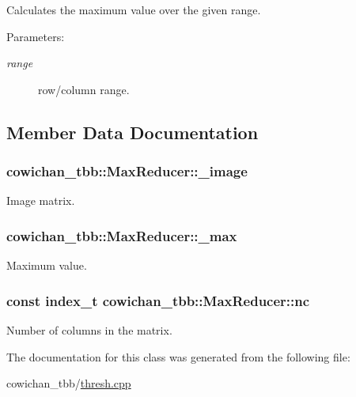 Calculates the maximum value over the given range. \begin{Desc}
\item[Parameters:]
\begin{description}
\item[{\em range}]row/column range. \end{description}
\end{Desc}


\subsection{Member Data Documentation}
\hypertarget{classcowichan__tbb_1_1_max_reducer_f8ca766f2d3f828c10b03077e41f3a6b}{
\subsubsection[{\_\-image}]{ {\bf cowichan\_\-tbb::MaxReducer::\_\-image}}}
\label{classcowichan__tbb_1_1_max_reducer_f8ca766f2d3f828c10b03077e41f3a6b}


Image matrix. \hypertarget{classcowichan__tbb_1_1_max_reducer_73c80dd6f6ded9d51b2c83e9a4a50501}{
\subsubsection[{\_\-max}]{ {\bf cowichan\_\-tbb::MaxReducer::\_\-max}}}
\label{classcowichan__tbb_1_1_max_reducer_73c80dd6f6ded9d51b2c83e9a4a50501}


Maximum value. \hypertarget{classcowichan__tbb_1_1_max_reducer_478817df677bfd5331c8a9a7f5e62de3}{
\subsubsection[{nc}]{\setlength{\rightskip}{0pt plus 5cm}const {\bf index\_\-t} {\bf cowichan\_\-tbb::MaxReducer::nc}}}
\label{classcowichan__tbb_1_1_max_reducer_478817df677bfd5331c8a9a7f5e62de3}


Number of columns in the matrix. 

The documentation for this class was generated from the following file:\begin{CompactItemize}
\item 
cowichan\_\-tbb/\hyperlink{cowichan__tbb_2thresh_8cpp}{thresh.cpp}\end{CompactItemize}
